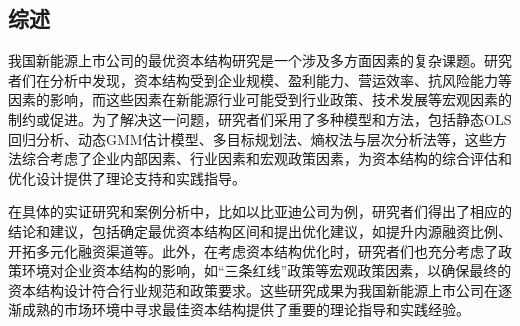 \subsection{综述}
我国新能源上市公司的最优资本结构研究是一个涉及多方面因素的复杂课题。研究者们在分析中发现，资本结构受到企业规模、盈利能力、营运效率、抗风险能力等因素的影响，而这些因素在新能源行业可能受到行业政策、技术发展等宏观因素的制约或促进。为了解决这一问题，研究者们采用了多种模型和方法，包括静态OLS回归分析、动态GMM估计模型、多目标规划法、熵权法与层次分析法等，这些方法综合考虑了企业内部因素、行业因素和宏观政策因素，为资本结构的综合评估和优化设计提供了理论支持和实践指导。

在具体的实证研究和案例分析中，比如以比亚迪公司为例，研究者们得出了相应的结论和建议，包括确定最优资本结构区间和提出优化建议，如提升内源融资比例、开拓多元化融资渠道等。此外，在考虑资本结构优化时，研究者们也充分考虑了政策环境对企业资本结构的影响，如“三条红线”政策等宏观政策因素，以确保最终的资本结构设计符合行业规范和政策要求。这些研究成果为我国新能源上市公司在逐渐成熟的市场环境中寻求最佳资本结构提供了重要的理论指导和实践经验。